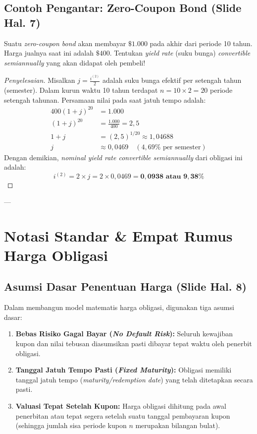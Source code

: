 \documentclass[11pt,a4paper]{article}
\begin{document}
\subsection{Contoh Pengantar: Zero-Coupon Bond (Slide Hal. 7)}

\begin{examplebox}
Suatu \textit{zero-coupon bond} akan membayar $\$1.000$ pada akhir dari periode 10 tahun. Harga jualnya saat ini adalah $\$400$. Tentukan \textit{yield rate} (suku bunga) \textit{convertible semiannually} yang akan didapat oleh pembeli!
\end{examplebox}

\begin{proof}[Penyelesaian]
Misalkan $j = \frac{i^{(2)}}{2}$ adalah suku bunga efektif per setengah tahun (semester). Dalam kurun waktu 10 tahun terdapat $n = 10 \times 2 = 20$ periode setengah tahunan. Persamaan nilai pada saat jatuh tempo adalah:
\begin{align*}
    400(1 + j)^{20} &= 1.000 \\
    (1 + j)^{20} &= \frac{1.000}{400} = 2{,}5 \\
    1 + j &= (2{,}5)^{1/20} \approx 1{,}04688 \\
    j &\approx 0{,}0469 \quad (4{,}69\% \text{ per semester})
\end{align*}
Dengan demikian, \textit{nominal yield rate convertible semiannually} dari obligasi ini adalah:
\begin{equation*}
    i^{(2)} = 2 \times j = 2 \times 0{,}0469 = \mathbf{0{,}0938 \text{ atau } 9{,}38\%}
\end{equation*}
\end{proof}

---

\section{Notasi Standar \& Empat Rumus Harga Obligasi}

\subsection{Asumsi Dasar Penentuan Harga (Slide Hal. 8)}

Dalam membangun model matematis harga obligasi, digunakan tiga asumsi dasar:
\begin{enumerate}[label=\textbf{\arabic*.}]
    \item \textbf{Bebas Risiko Gagal Bayar (\textit{No Default Risk}):} Seluruh kewajiban kupon dan nilai tebusan diasumsikan pasti dibayar tepat waktu oleh penerbit obligasi.
    \item \textbf{Tanggal Jatuh Tempo Pasti (\textit{Fixed Maturity}):} Obligasi memiliki tanggal jatuh tempo (\textit{maturity/redemption date}) yang telah ditetapkan secara pasti.
    \item \textbf{Valuasi Tepat Setelah Kupon:} Harga obligasi dihitung pada awal penerbitan atau tepat segera setelah suatu tanggal pembayaran kupon (sehingga jumlah sisa periode kupon $n$ merupakan bilangan bulat).
\end{enumerate}
\end{document}
